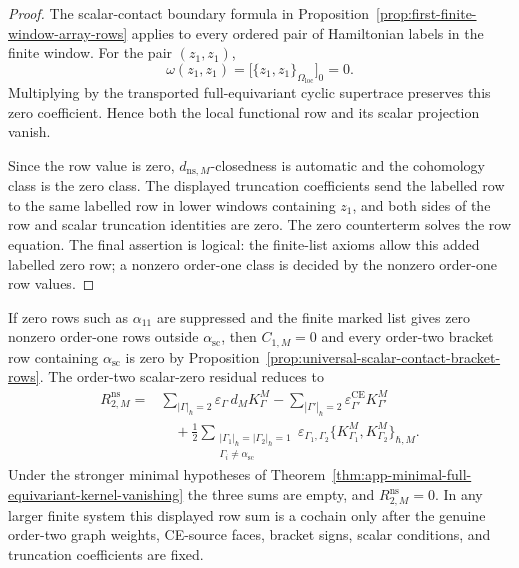 \begin{proof}
  The scalar-contact boundary formula in
  Proposition~\ref{prop:first-finite-window-array-rows} applies to every
  ordered pair of Hamiltonian labels in the finite window.  For the pair
  \((z_1,z_1)\),
  \[
    \omega(z_1,z_1)
      =
    \bigl[\{z_1,z_1\}_{\Omega_{\mathrm{loc}}}\bigr]_0=0.
  \]
  Multiplying by the transported full-equivariant cyclic supertrace
  preserves this zero coefficient.  Hence both the local functional row and
  its scalar projection vanish.

  Since the row value is zero, \(d_{\mathrm{ns},M}\)-closedness is
  automatic and the cohomology class is the zero class.  The displayed
  truncation coefficients send the labelled row to the same labelled row in
  lower windows containing \(z_1\), and both sides of the row and scalar
  truncation identities are zero.  The zero counterterm solves the row
  equation.  The final assertion is logical: the finite-list axioms allow
  this added labelled zero row; a nonzero order-one class is decided by
  the nonzero order-one row values.
\end{proof}

\begin{rmk}
\label{rmk:app-order-two-after-zero-nonzero-order-one-rows}
  If zero rows such as \(\alpha_{11}\) are suppressed and the finite marked
  list gives zero nonzero order-one rows outside
  \(\alpha_{\mathrm{sc}}\), then \(C_{1,M}=0\) and every order-two bracket
  row containing \(\alpha_{\mathrm{sc}}\) is zero by
  Proposition~\ref{prop:universal-scalar-contact-bracket-rows}.  The
  order-two scalar-zero residual reduces to
  \[
  \begin{aligned}
    R^{\mathrm{ns}}_{2,M}
      ={}&
      \sum_{|\Gamma|_\hbar=2}
        \varepsilon_\Gamma\,d_M K^M_\Gamma
      -\sum_{|\Gamma'|_\hbar=2}
        \varepsilon^{\mathrm{CE}}_{\Gamma'}K^M_{\Gamma'}  \\
      &\quad
      +\frac12
      \sum_{\substack{|\Gamma_1|_\hbar=|\Gamma_2|_\hbar=1\\
        \Gamma_i\neq\alpha_{\mathrm{sc}}}}
        \varepsilon_{\Gamma_1,\Gamma_2}
        \bigl\{K^M_{\Gamma_1},K^M_{\Gamma_2}\bigr\}_{\hbar,M}.
  \end{aligned}
  \]
  Under the stronger minimal hypotheses of
  Theorem~\ref{thm:app-minimal-full-equivariant-kernel-vanishing} the
  three sums are empty, and \(R^{\mathrm{ns}}_{2,M}=0\).  In any larger
  finite system this displayed row sum is a cochain only after the
  genuine order-two graph weights, CE-source faces, bracket signs, scalar
  conditions, and truncation coefficients are fixed.
\end{rmk}

